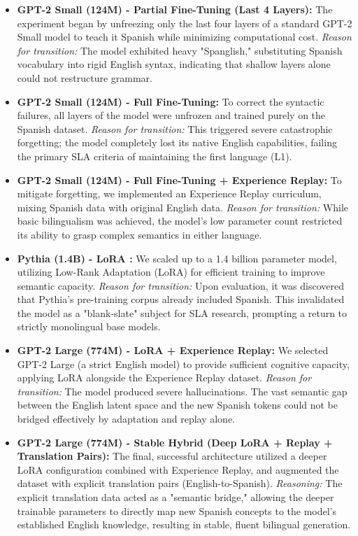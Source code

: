 \begin{itemize}
    \item \textbf{GPT-2 Small (124M) \cite{radford2019language} - Partial Fine-Tuning (Last 4 Layers):} The experiment began by unfreezing only the last four layers of a standard GPT-2 Small model to teach it Spanish while minimizing computational cost. \textit{Reason for transition:} The model exhibited heavy "Spanglish," substituting Spanish vocabulary into rigid English syntax, indicating that shallow layers alone could not restructure grammar.

    \item \textbf{GPT-2 Small (124M) - Full Fine-Tuning:} To correct the syntactic failures, all layers of the model were unfrozen and trained purely on the Spanish dataset. \textit{Reason for transition:} This triggered severe catastrophic forgetting; the model completely lost its native English capabilities, failing the primary SLA criteria of maintaining the first language (L1).

    \item \textbf{GPT-2 Small (124M) - Full Fine-Tuning + Experience Replay:} To mitigate forgetting, we implemented an Experience Replay curriculum, mixing Spanish data with original English data. \textit{Reason for transition:} While basic bilingualism was achieved, the model's low parameter count restricted its ability to grasp complex semantics in either language.

    \item \textbf{Pythia (1.4B) \cite{biderman2023pythia} - LoRA \cite{hu2021lora}:} We scaled up to a 1.4 billion parameter model, utilizing Low-Rank Adaptation (LoRA) for efficient training to improve semantic capacity. \textit{Reason for transition:} Upon evaluation, it was discovered that Pythia's pre-training corpus already included Spanish. This invalidated the model as a "blank-slate" subject for SLA research, prompting a return to strictly monolingual base models.

    \item \textbf{GPT-2 Large (774M) \cite{radford2019language} - LoRA + Experience Replay:} We selected GPT-2 Large (a strict English model) to provide sufficient cognitive capacity, applying LoRA alongside the Experience Replay dataset. \textit{Reason for transition:} The model produced severe hallucinations. The vast semantic gap between the English latent space and the new Spanish tokens could not be bridged effectively by adaptation and replay alone.

    \item \textbf{GPT-2 Large (774M) - Stable Hybrid (Deep LoRA + Replay + Translation Pairs):} The final, successful architecture utilized a deeper LoRA configuration combined with Experience Replay, and augmented the dataset with explicit translation pairs (English-to-Spanish). \textit{Reasoning:} The explicit translation data acted as a "semantic bridge," allowing the deeper trainable parameters to directly map new Spanish concepts to the model's established English knowledge, resulting in stable, fluent bilingual generation.
\end{itemize}

